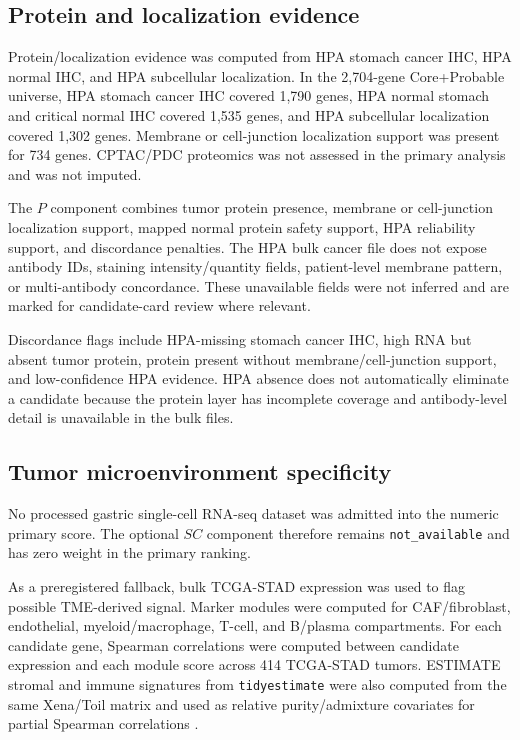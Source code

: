 \documentclass[twocolumn]{article}
\begin{document}
\subsection{Protein and localization evidence}

Protein/\allowbreak{}localization evidence was computed from HPA stomach cancer IHC, HPA normal IHC, and HPA subcellular localization. In the 2,704-gene Core+\allowbreak{}Probable universe, HPA stomach cancer IHC covered 1,790 genes, HPA normal stomach and critical normal IHC covered 1,535 genes, and HPA subcellular localization covered 1,302 genes. Membrane or cell-junction localization support was present for 734 genes. CPTAC/\allowbreak{}PDC proteomics was not assessed in the primary analysis and was not imputed.

The $P$ component combines tumor protein presence, membrane or cell-junction localization support, mapped normal protein safety support, HPA reliability support, and discordance penalties. The HPA bulk cancer file does not expose antibody IDs, staining intensity/\allowbreak{}quantity fields, patient-level membrane pattern, or multi-antibody concordance. These unavailable fields were not inferred and are marked for candidate-card review where relevant.

Discordance flags include HPA-missing stomach cancer IHC, high RNA but absent tumor protein, protein present without membrane/\allowbreak{}cell-junction support, and low-confidence HPA evidence. HPA absence does not automatically eliminate a candidate because the protein layer has incomplete coverage and antibody-level detail is unavailable in the bulk files.

\subsection{Tumor microenvironment specificity}

No processed gastric single-cell RNA-seq dataset was admitted into the numeric primary score. The optional $SC$ component therefore remains \texttt{not\_available} and has zero weight in the primary ranking.

As a preregistered fallback, bulk TCGA-STAD expression was used to flag possible TME-derived signal. Marker modules were computed for CAF/\allowbreak{}fibroblast, endothelial, myeloid/\allowbreak{}macrophage, T-cell, and B/\allowbreak{}plasma compartments. For each candidate gene, Spearman correlations were computed between candidate expression and each module score across 414 TCGA-STAD tumors. ESTIMATE stromal and immune signatures from \texttt{tidyestimate} were also computed from the same Xena/\allowbreak{}Toil matrix and used as relative purity/\allowbreak{}admixture covariates for partial Spearman correlations \cite{yoshihara2013estimate}.
\end{document}
